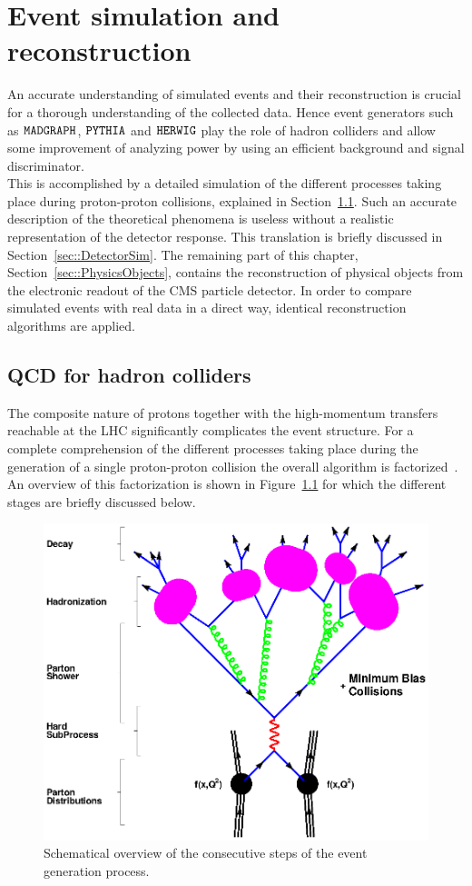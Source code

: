 \chapter{Event simulation and reconstruction} \label{chp:labelTitle}

An accurate understanding of simulated events and their reconstruction is crucial for a thorough understanding of the collected data. Hence event generators such as $\texttt{MADGRAPH}$, $\texttt{PYTHIA}$ and $\texttt{HERWIG}$ play the role of hadron colliders and allow some improvement of analyzing power by using an efficient background and signal discriminator.
\\
This is accomplished by a detailed simulation of the different processes taking place during proton-proton collisions, explained in Section~\ref{sec::QCDHadron}. Such an accurate description of the theoretical phenomena is useless without a realistic representation of the detector response. This translation is briefly discussed in Section~\ref{sec::DetectorSim}. The remaining part of this chapter, Section~\ref{sec::PhysicsObjects}, contains the reconstruction of physical objects from the electronic readout of the CMS particle detector.
In order to compare simulated events with real data in a direct way, identical reconstruction algorithms are applied.

\section{QCD for hadron colliders} \label{sec::QCDHadron}

The composite nature of protons together with the high-momentum transfers reachable at the LHC significantly complicates the event structure. 
For a complete comprehension of the different processes taking place during the generation of a single proton-proton collision the overall algorithm is factorized~\cite{}.
An overview of this factorization is shown in Figure~\ref{fig::EvtShower} for which the different stages are briefly discussed below.

\begin{figure}[htb]
 \centering
 \includegraphics[width = 0.8 \textwidth]{Chapters/Chapter3/Figures/f_shg_event.eps}
 \caption{Schematical overview of the consecutive steps of the event generation process.}  
 \label{fig::EvtShower}
\end{figure}

